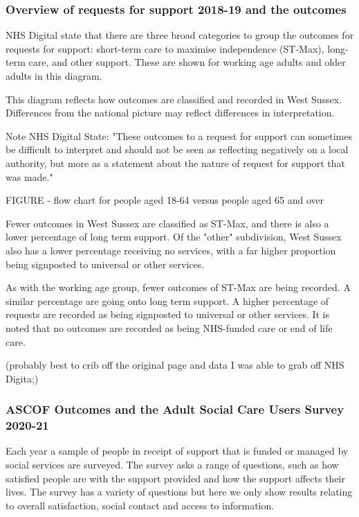 \subsubsection{Overview of requests for support 2018-19 and the outcomes}
NHS Digital state that there are three broad categories to group the outcomes for requests for support: short-term care to maximise independence (ST-Max), long-term care, and other support. These are shown for working age adults and older adults in this diagram.

This diagram reflects how outcomes are classified and recorded in West Sussex. Differences from the national picture may reflect differences in interpretation.

Note NHS Digital State: "These outcomes to a request for support can sometimes be difficult to interpret and should not be seen as reflecting negatively on a local authority, but more as a statement about the nature of request for support that was made."

FIGURE - flow chart for people aged 18-64 versus people aged 65 and over

Fewer outcomes in West Sussex are classified as ST-Max, and there is also a lower percentage of long term support. Of the "other" subdivision, West Sussex also has a lower percentage receiving no services, with a far higher proportion being signposted to universal or other services.

As with the working age group, fewer outcomes of ST-Max are being recorded. A similar percentage are going onto long term support. A higher percentage of requests are recorded as being signposted to universal or other services. It is noted that no outcomes are recorded as being NHS-funded care or end of life care.

(probably best to crib off the original page and data I was able to grab off NHS Digita;)

\subsubsection{ASCOF Outcomes and the Adult Social Care Users Survey 2020-21}
Each year a sample of people in receipt of support that is funded or managed by social services are surveyed. The survey asks a range of questions, such as how satisfied people are with the support provided and how the support affects their lives. The survey has a variety of questions but here we only show results relating to overall satisfaction, social contact and access to information.

